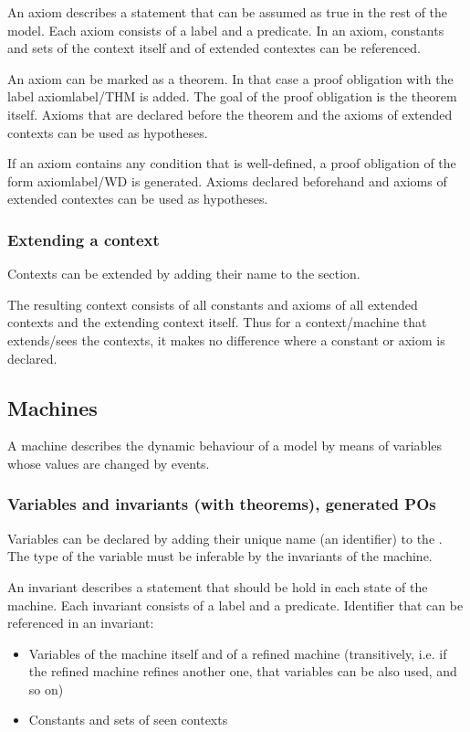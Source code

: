An axiom describes a statement that can be assumed as true in the rest of the model.
Each axiom consists of a label and a predicate.
In an axiom, constants and sets of the context itself and of extended contextes can be referenced.

An axiom can be marked as a theorem. In that case a proof obligation with the label \textsf{axiomlabel/THM} is added.
The goal of the proof obligation is the theorem itself.
Axioms that are declared before the theorem and the axioms of extended contexts can be used as hypotheses.

If an axiom contains any condition that is well-defined, a proof obligation of the form \textsf{axiomlabel/WD} is generated.
Axioms declared beforehand and axioms of extended contextes can be used as hypotheses.
   
\subsubsection{Extending a context}
Contexts can be extended by adding their name to the  section.

The resulting context consists of all constants and axioms of all extended contexts and the extending context itself.
Thus for a context/machine that extends/sees the contexts, it makes no difference where a constant or axiom is declared.

\subsection{Machines}
A machine describes the dynamic behaviour of a model by means of variables whose values are changed by events.

\subsubsection{Variables and invariants (with theorems), generated POs}
Variables can be declared by adding their unique name (an identifier) to the .
The type of the variable must be inferable by the invariants of the machine.

An invariant describes a statement that should be hold in each state of the machine.
Each invariant consists of a label and a predicate.
Identifier that can be referenced in an invariant:
\begin{itemize}
\item Variables of the machine itself and of a refined machine (transitively, i.e. if the refined machine refines another one, that variables can be also used, and so on)
\item Constants and sets of seen contexts
\end{itemize}

